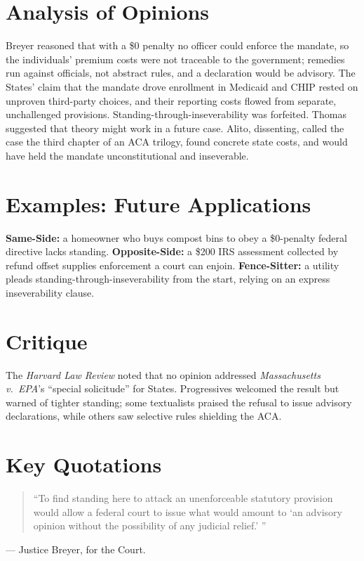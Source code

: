 \documentclass[12pt]{article}
\begin{document}
\section{Analysis of Opinions}
Breyer reasoned that with a \$0 penalty no officer could enforce the mandate, so the individuals' premium costs were not traceable to the government; remedies run against officials, not abstract rules, and a declaration would be advisory. The States' claim that the mandate drove enrollment in Medicaid and CHIP rested on unproven third-party choices, and their reporting costs flowed from separate, unchallenged provisions. Standing-through-inseverability was forfeited. Thomas suggested that theory might work in a future case. Alito, dissenting, called the case the third chapter of an ACA trilogy, found concrete state costs, and would have held the mandate unconstitutional and inseverable.

\section{Examples: Future Applications}
\textbf{Same-Side:} a homeowner who buys compost bins to obey a \$0-penalty federal directive lacks standing. \textbf{Opposite-Side:} a \$200 IRS assessment collected by refund offset supplies enforcement a court can enjoin. \textbf{Fence-Sitter:} a utility pleads standing-through-inseverability from the start, relying on an express inseverability clause.

\section{Critique}
The \textit{Harvard Law Review} noted that no opinion addressed \textit{Massachusetts v.\ EPA}'s ``special solicitude'' for States. Progressives welcomed the result but warned of tighter standing; some textualists praised the refusal to issue advisory declarations, while others saw selective rules shielding the ACA.

\section{Key Quotations}
\begin{quote}
``To find standing here to attack an unenforceable statutory provision would allow a federal court to issue what would amount to `an advisory opinion without the possibility of any judicial relief.' ''
\end{quote}
\noindent --- Justice Breyer, for the Court.
\end{document}
